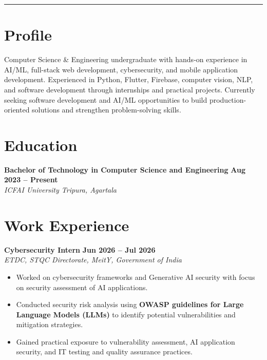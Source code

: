 \documentclass[10pt,a4paper]{article}
\newcommand{\resumeWorkHeading}[3]{
    \textbf{#1}
    \hfill
    \textbf{#3}
    \\
    \textit{#2}
    \vspace{1pt}
}
\begin{document}
\vspace{5pt}
\rule{\textwidth}{0.6pt}


\section{Profile}

\begin{justify}
Computer Science \& Engineering undergraduate with hands-on experience in
AI/ML, full-stack web development, cybersecurity, and mobile application
development. Experienced in Python, Flutter, Firebase, computer vision,
NLP, and software development through internships and practical projects.
Currently seeking software development and AI/ML opportunities to build
production-oriented solutions and strengthen problem-solving skills.
\end{justify}


\section{Education}

\resumeWorkHeading
{Bachelor of Technology in Computer Science and Engineering}
{ICFAI University Tripura, Agartala}
{Aug 2023 -- Present}

\vspace{2pt}


\section{Work Experience}


\resumeWorkHeading
{Cybersecurity Intern}
{ETDC, STQC Directorate, MeitY, Government of India}
{Jun 2026 -- Jul 2026}

\begin{itemize}[leftmargin=14pt, itemsep=1pt, topsep=1pt]
    \item Worked on cybersecurity frameworks and Generative AI security with
    focus on security assessment of AI applications.
    
    \item Conducted security risk analysis using
    \textbf{OWASP guidelines for Large Language Models (LLMs)} to identify
    potential vulnerabilities and mitigation strategies.
    
    \item Gained practical exposure to vulnerability assessment,
    AI application security, and IT testing and quality assurance practices.
\end{itemize}
\end{document}
